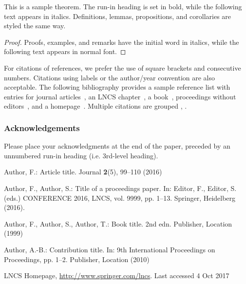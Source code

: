\documentclass[runningheads]{llncs}
\begin{document}
\begin{theorem}
This is a sample theorem. The run-in heading is set in bold, while
the following text appears in italics. Definitions, lemmas,
propositions, and corollaries are styled the same way.
\end{theorem}
%
%
\begin{proof}
Proofs, examples, and remarks have the initial word in italics,
while the following text appears in normal font.
\end{proof}
For citations of references, we prefer the use of square brackets
and consecutive numbers. Citations using labels or the author/year
convention are also acceptable. The following bibliography provides
a sample reference list with entries for journal
articles~\cite{ref_article1}, an LNCS chapter~\cite{ref_lncs1}, a
book~\cite{ref_book1}, proceedings without editors~\cite{ref_proc1},
and a homepage~\cite{ref_url1}. Multiple citations are grouped
\cite{ref_article1,ref_lncs1,ref_book1},
\cite{ref_article1,ref_book1,ref_proc1,ref_url1}.

\subsubsection{Acknowledgements} Please place your acknowledgments at
the end of the paper, preceded by an unnumbered run-in heading (i.e.
3rd-level heading).

%
%
%
% 
% 
%
\begin{thebibliography}{8}
Author, F.: Article title. Journal \textbf{2}(5), 99--110 (2016)

Author, F., Author, S.: Title of a proceedings paper. In: Editor,
F., Editor, S. (eds.) CONFERENCE 2016, LNCS, vol. 9999, pp. 1--13.
Springer, Heidelberg (2016). 

Author, F., Author, S., Author, T.: Book title. 2nd edn. Publisher,
Location (1999)

Author, A.-B.: Contribution title. In: 9th International Proceedings
on Proceedings, pp. 1--2. Publisher, Location (2010)

LNCS Homepage, \url{http://www.springer.com/lncs}. Last accessed 4
Oct 2017
\end{thebibliography}
\end{document}
